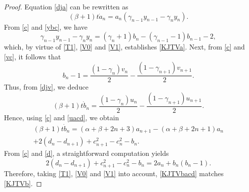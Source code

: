 \documentclass[10pt, reqno]{amsart}
\numberwithin{equation}{section}
\numberwithin{equation}{section}
\begin{document}
\begin{proof}
Equation \eqref{dja} can be rewritten as
\begin{equation*}
(\beta+1)t\dot{a}_n=a_n(\gamma_{n-1}y_{n-1}-\gamma_ny_n).
\end{equation*}
From \eqref{c} and \eqref{ybc}, we have
\begin{equation*}
\gamma_{n-1}y_{n-1}-\gamma_ny_n=(\gamma_n+1)b_n-(\gamma_{n-1}-1)b_{n-1}-2,
\end{equation*}
which, by virtue of \eqref{T1}, \eqref{V0} and \eqref{V1}, establishes \eqref{KJTVa}. Next, from \eqref{c} and \eqref{vc}, it follows that
\begin{equation*}
b_n-1=\frac{(1-\gamma_n)v_n}{2}-\frac{(1-\gamma_{n+1})v_{n+1}}{2}.
\end{equation*}
Thus, from \eqref{djv}, we deduce
\begin{equation*}
(\beta+1)t\dot{b}_n=\frac{(1-\gamma_n)u_n}{2}-\frac{(1-\gamma_{n+1})u_{n+1}}{2}.
\end{equation*}
Hence, using \eqref{c} and \eqref{uacd}, we obtain
\begin{multline}
(\beta+1)t\dot{b}_n=(\alpha+\beta+2n+3)a_{n+1}
-(\alpha+\beta+2n+1)a_n\\+2(d_n-d_{n+1})+c_{n+1}^2-c_n^2-b_n. \label{KJTVbacd}
\end{multline}
From \eqref{c} and \eqref{d}, a straightforward computation yields
\begin{equation*}
2(d_n-d_{n+1})+c_{n+1}^2-c_n^2-b_n=2a_n+b_n(b_n-1).
\end{equation*}
Therefore, taking \eqref{T1}, \eqref{V0} and \eqref{V1} into account, \eqref{KJTVbacd} matches \eqref{KJTVb}.
\end{proof}
\end{document}
